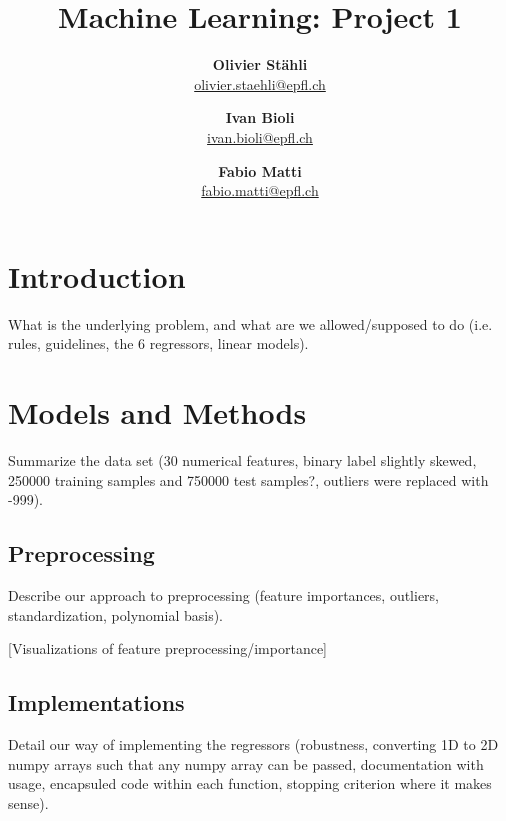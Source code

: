\documentclass[11pt, a4paper, twocolumn]{article}
\title{\bfseries Machine Learning: Project 1}
\author{\textbf{Olivier Stähli} \\ \href{mailto:olivier.staehli@epfl.ch}{olivier.staehli@epfl.ch}
   \and \textbf{Ivan Bioli} \\ \href{mailto:ivan.bioli@epfl.ch}{ivan.bioli@epfl.ch}
   \and \textbf{Fabio Matti} \\ \href{mailto:fabio.matti@epfl.ch}{fabio.matti@epfl.ch}}
\date{}
\begin{document}

\section{Introduction}
\label{sec:introduction}

What is the underlying problem, and what are we allowed/supposed to do (i.e.
rules, guidelines, the 6 regressors, linear models).

\section{Models and Methods}
\label{sec:models}

Summarize the data set (30 numerical features, binary label slightly skewed,
250000 training samples and 750000 test samples?, outliers were replaced with
-999).

\subsection{Preprocessing}
\label{subsec:preprocessing}

Describe our approach to preprocessing (feature importances, outliers,
standardization, polynomial basis).

[Visualizations of feature preprocessing/importance]

\subsection{Implementations}
\label{subsec:implementations}

Detail our way of implementing the regressors (robustness, converting 1D to 2D
numpy arrays such that any numpy array can be passed, documentation with usage,
encapsuled code within each function, stopping criterion where it makes sense).
\end{document}
